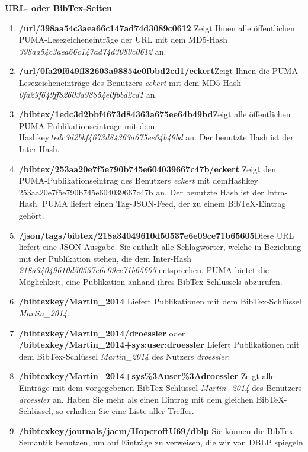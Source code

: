 \textbf{URL- oder BibTex-Seiten}
\begin{enumerate}
    \item \textbf{/url/398aa54c3aea66c147ad74d3089c0612}\newline
    Zeigt Ihnen alle öffentlichen PUMA-Lesezeicheneinträge der URL mit dem MD5-Hash \textit{398aa54c3aea66c147ad74d3089c0612} an.
    \item \textbf{/url/0fa29f649ff82603a98854e0fbbd2cd1/eckert}\newline Zeigt Ihnen die PUMA-Lesezeicheneinträge des Benutzers \textit{eckert} mit dem MD5-Hash \textit{0fa29f649ff82603a98854e0fbbd2cd1} an.
	\item \textbf{/bibtex/1edc3d2bbf4673d84363a675ee64b49bd}\newline Zeigt alle öffentlichen PUMA-Publikationseinträge mit dem Hashkey\newline \textit{1edc3d2bbf4673d84363a675ee64b49bd} an. Der benutzte Hash ist der Inter-Hash.
    \item \textbf{/bibtex/253aa20e7f5e790b745e604039667c47b/eckert}\newline
    Zeigt den PUMA-Publikationseintrag des Benutzers \textit{eckert} mit dem\newline Hashkey 253aa20e7f5e790b745e604039667c47b an. Der benutzte Hash ist der Intra-Hash. PUMA liefert einen Tag-JSON-Feed, der zu einem BibTeX-Eintrag gehört.
    \item \textbf{/json/tags/bibtex/218a34049610d50537e6e09ce71b65605}\newline Diese URL liefert eine JSON-Ausgabe. Sie enthält alle Schlagwörter, welche in Beziehung mit der Publikation stehen, die dem Inter-Hash \textit{218a34049610d50537e6e09ce71b65605} entsprechen. PUMA bietet die Möglichkeit, eine Publikation anhand ihres BibTex-Schlüssels abzurufen.
    \item \textbf{/bibtexkey/Martin\_2014} \newline
    Liefert Publikationen mit dem BibTex-Schlüssel \textit{Martin\_2014}.
    \item \textbf{/bibtexkey/Martin\_2014/droessler} 
    oder \newline \textbf{/bibtexkey/Martin\_2014+sys:user:droessler}\newline
    Liefert Publikationen mit dem BibTex-Schlüssel \textit{Martin\_2014} des Nutzers \textit{droessler}.
    \item \textbf{/bibtexkey/Martin\_2014+sys\%3Auser\%3Adroessler} \newline
    Zeigt alle Einträge mit dem vorgegebenen BibTex-Schlüssel \textit{Martin\_2014} des Benutzers \textit{droessler} an. Haben Sie mehr als einen Eintrag mit dem gleichen BibTeX-Schlüssel, so erhalten Sie eine Liste aller Treffer.
    \item \textbf{/bibtexkey/journals/jacm/HopcroftU69/dblp} \newline
    Sie können die BibTex-Semantik benutzen, um auf Einträge zu verweisen, die wir von DBLP spiegeln  %
\end{enumerate}
